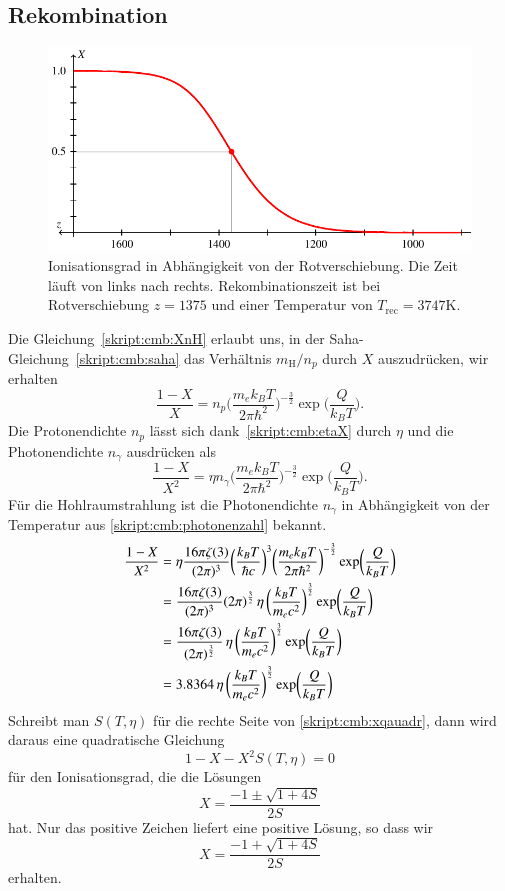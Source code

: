 \subsection{Rekombination}
\begin{figure}
\centering
\includegraphics{chapters/tikz/rekombination.pdf}
\caption{Ionisationsgrad in Abhängigkeit von der Rotverschiebung.
Die Zeit läuft von links nach rechts.
Rekombinationszeit ist bei Rotverschiebung $z=1375$ und einer Temperatur
von $T_{\text{rec}}=3747\text{K}$.
\label{skript:cmb:rekombinationgraph}}
\end{figure}
Die Gleichung~\eqref{skript:cmb:XnH} erlaubt uns, in der
Saha-Gleichung~\eqref{skript:cmb:saha} das Verhältnis $m_\text{H}/n_p$
durch $X$ auszudrücken, wir erhalten
\begin{equation}
\frac{1-X}{X}
=
n_p
\biggl(\frac{m_ek_BT}{2\pi \hbar^2}\biggr)^{-\frac32}
\exp\biggl( \frac{Q}{k_BT} \biggr).
\end{equation}
Die Protonendichte $n_p$ lässt sich dank~\eqref{skript:cmb:etaX}
durch $\eta$ und die Photonendichte $n_\gamma$ ausdrücken als
\[
\frac{1-X}{X^2}=\eta n_\gamma
\biggl(\frac{m_ek_BT}{2\pi \hbar^2}\biggr)^{-\frac32}
\exp\biggl( \frac{Q}{k_BT} \biggr).
\]
Für die Hohlraumstrahlung ist die Photonendichte $n_\gamma$ in Abhängigkeit
von der Temperatur aus \eqref{skript:cmb:photonenzahl} bekannt.
\begin{align}
\frac{1-X}{X^2}
&=\eta
\frac{16\pi\zeta(3)}{(2\pi)^3}
\biggl(\frac{k_BT}{\hbar c}\biggr)^3
\biggl(\frac{m_ek_BT}{2\pi \hbar^2}\biggr)^{-\frac32}
\exp\biggl( \frac{Q}{k_BT} \biggr)
\notag
\\
&=
\frac{16\pi\zeta(3)}{(2\pi)^3}(2\pi)^{\frac32}
\,
\eta
\,
\biggl(\frac{k_BT}{m_ec^2}\biggr)^{\frac32}
\exp\biggl( \frac{Q}{k_BT} \biggr)
\\
&=
\frac{16\pi\zeta(3)}{(2\pi)^{\frac32}}
\,
\eta
\,
\biggl(\frac{k_BT}{m_ec^2}\biggr)^{\frac32}
\exp\biggl( \frac{Q}{k_BT} \biggr)
\\
&=
3.8364
\,
\eta
\,
\biggl(\frac{k_BT}{m_ec^2}\biggr)^{\frac32}
\exp\biggl( \frac{Q}{k_BT} \biggr)
\label{skript:cmb:xqauadr}
\end{align}
Schreibt man $S(T,\eta)$ für die rechte Seite von \eqref{skript:cmb:xqauadr},
dann wird daraus eine quadratische Gleichung
\[
1-X-X^2 S(T,\eta)=0
\]
für den Ionisationsgrad, die die Lösungen
\[
X = \frac{-1\pm\sqrt{1+4S}}{2S}
\]
hat.
Nur das positive Zeichen liefert eine positive Lösung, so dass wir
\[
X=\frac{-1+\sqrt{1+4S}}{2S}
\]
erhalten.

